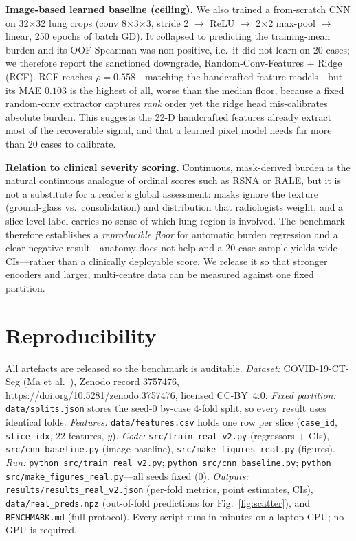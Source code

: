 \documentclass[conference]{IEEEtran}
\begin{document}
\textbf{Image-based learned baseline (ceiling).} We also trained a from-scratch
CNN on 32$\times$32 lung crops (conv 8$\times$3$\times$3, stride 2 $\to$ ReLU
$\to$ 2$\times$2 max-pool $\to$ linear, 250 epochs of batch GD). It collapsed to
predicting the training-mean burden and its OOF Spearman was non-positive, i.e.\
it did not learn on 20 cases; we therefore report the sanctioned downgrade,
Random-Conv-Features + Ridge (RCF). RCF reaches $\rho{=}0.558$---matching the
handcrafted-feature models---but its MAE $0.103$ is the highest of all, worse
than the median floor, because a fixed random-conv extractor captures \emph{rank}
order yet the ridge head mis-calibrates absolute burden. This suggests the 22-D
handcrafted features already extract most of the recoverable signal, and that a
learned pixel model needs far more than 20 cases to calibrate.

\textbf{Relation to clinical severity scoring.} Continuous, mask-derived burden is
the natural continuous analogue of ordinal scores such as RSNA or RALE, but it is
not a substitute for a reader's global assessment: masks ignore the texture
(ground-glass vs.\ consolidation) and distribution that radiologists weight, and a
slice-level label carries no sense of which lung region is involved. The benchmark
therefore establishes a \emph{reproducible floor} for automatic burden regression
and a clear negative result---anatomy does not help and a 20-case sample yields
wide CIs---rather than a clinically deployable score. We release it so that
stronger encoders and larger, multi-centre data can be measured against one fixed
partition.

\section{Reproducibility}
All artefacts are released so the benchmark is auditable. \emph{Dataset:}
COVID-19-CT-Seg (Ma et al.~\cite{ma2021covidseg}), Zenodo record 3757476,
\url{https://doi.org/10.5281/zenodo.3757476}, licensed CC-BY~4.0. \emph{Fixed
partition:} \texttt{data/splits.json} stores the seed-0 by-case 4-fold split, so
every result uses identical folds. \emph{Features:} \texttt{data/features.csv}
holds one row per slice (\texttt{case\_id}, \texttt{slice\_idx}, 22 features,
$y$). \emph{Code:} \texttt{src/train\_real\_v2.py} (regressors + CIs),
\texttt{src/cnn\_baseline.py} (image baseline),
\texttt{src/make\_figures\_real.py} (figures). \emph{Run:}
\texttt{python src/train\_real\_v2.py}; \texttt{python src/cnn\_baseline.py};
\texttt{python src/make\_figures\_real.py}---all seeds fixed (0).
\emph{Outputs:} \texttt{results/results\_real\_v2.json} (per-fold metrics, point
estimates, CIs), \texttt{data/real\_preds.npz} (out-of-fold predictions for
Fig.~\ref{fig:scatter}), and \texttt{BENCHMARK.md} (full protocol). Every script runs in minutes on a laptop
CPU; no GPU is required.
\end{document}
